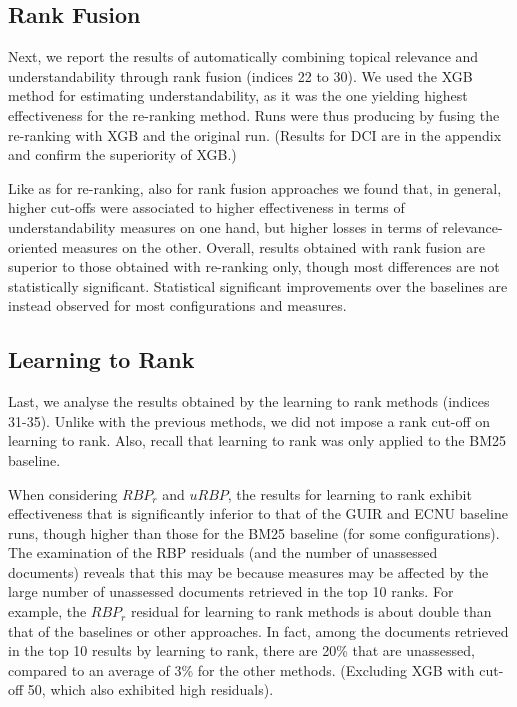 \subsection{Rank Fusion}
\label{results:fusion}

Next, we report the results of automatically combining topical relevance and understandability through rank fusion (indices 22 to 30). We used the XGB method for estimating understandability, as it was the one yielding highest effectiveness for the re-ranking method. Runs were thus producing by fusing the re-ranking with XGB and the original run. (Results for DCI are in the appendix and confirm the superiority of XGB.) 

Like as for re-ranking, also for rank fusion approaches we found that, in general, higher cut-offs were associated to higher effectiveness in terms of understandability measures on one hand, but higher losses in terms of relevance-oriented measures on the other. Overall, results obtained with rank fusion are superior to those obtained with re-ranking only, though most differences are not statistically significant. Statistical significant improvements over the baselines are instead observed for most configurations and measures.  

\subsection{Learning to Rank}
\label{results:ltr}

Last, we analyse the results obtained by the learning to rank methods (indices 31-35). Unlike with the previous methods, we did not impose a rank cut-off on learning to rank. Also, recall that learning to rank was only applied to the BM25 baseline. 

When considering $RBP_r$ and $uRBP$, the results for learning to rank exhibit effectiveness that is significantly inferior to that of the GUIR and ECNU baseline runs, though higher than those for the BM25 baseline (for some configurations). The examination of the RBP residuals (and the number of unassessed documents) reveals that this may be because measures may be affected by the large number of unassessed documents retrieved in the top 10 ranks. For example, the $RBP_r$ residual for learning to rank methods is about double than that of the baselines or other approaches. In fact, among the documents retrieved in the top 10 results by learning to rank, there are 20\% that are unassessed, compared to an average of 3\% for the other methods. (Excluding XGB with cut-off 50, which also exhibited high residuals). 

